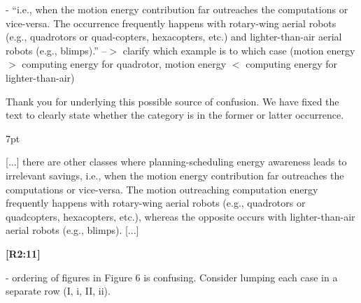 \documentclass[10pt]{letter}
\newenvironment{formal}{%
  \def\FrameCommand{%
    \hspace{1pt}%
    {\color{red}\vrule width 2pt}%
    {\color{formalshade}\vrule width 4pt}%
    \colorbox{formalshade}%
  }%
  \MakeFramed{\advance\hsize-\width\FrameRestore}%
  \noindent\hspace{-4.55pt}%
  \begin{adjustwidth}{}{7pt}%
  \vspace{2pt}\vspace{2pt}%
}
{%
  \vspace{2pt}\end{adjustwidth}\endMakeFramed%
}
\begin{document}
- ``i.e., when the motion energy contribution far outreaches the computations or vice-versa. The occurrence frequently happens with rotary-wing aerial robots (e.g., quadrotors or quad-copters, hexacopters, etc.) and lighter-than-air aerial robots (e.g., blimps).'' --$>$ clarify which example is to which case (motion energy $>$ computing energy for quadrotor, motion energy $<$ computing energy for lighter-than-air)
  
{\color{blue} 

{\hspace*{-4.5em}{[R2:10]}\vspace*{-1.9em}}

Thank you for underlying this possible source of confusion. We have fixed the text to clearly state whether the category is in the former or latter occurrence.

\begin{formal}
  \color{black} [...] there are other classes where planning-scheduling energy awareness leads to irrelevant savings, i.e., when the motion energy contribution far outreaches the computations or vice-versa. The {\color{blue}motion outreaching computation energy} frequently happens with rotary-wing aerial robots (e.g., quadrotors or quadcopters, hexacopters, etc.){\color{blue}, whereas the opposite occurs with} lighter-than-air aerial robots (e.g., blimps). [...]
  \vspace*{1ex}
\end{formal}}

{\hspace*{-4.5em}\textbf{[R2:11]}\vspace*{-1.9em}}

- ordering of figures in Figure 6 is confusing. Consider lumping each case in a separate row (I, i, II, ii). 
  
\end{document}
